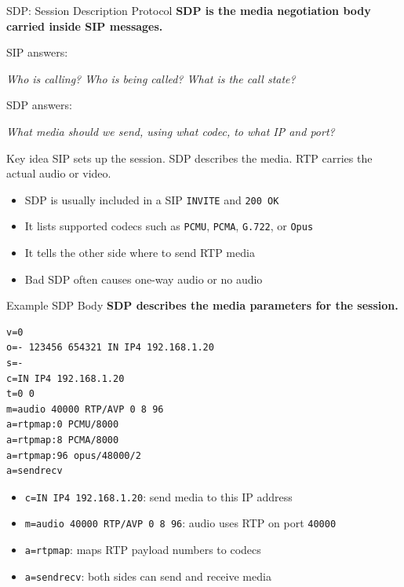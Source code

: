 \documentclass[aspectratio=169]{beamer}
\begin{document}
\begin{frame}{SDP: Session Description Protocol}
\textbf{SDP is the media negotiation body carried inside SIP messages.}

\vspace{0.4cm}

SIP answers:

\begin{center}
\textit{Who is calling? Who is being called? What is the call state?}
\end{center}

SDP answers:

\begin{center}
\textit{What media should we send, using what codec, to what IP and port?}
\end{center}

\vspace{0.3cm}

\begin{block}{Key idea}
SIP sets up the session. SDP describes the media. RTP carries the actual audio or video.
\end{block}

\vspace{0.3cm}

\begin{itemize}
    \item SDP is usually included in a SIP \texttt{INVITE} and \texttt{200 OK}
    \item It lists supported codecs such as \texttt{PCMU}, \texttt{PCMA}, \texttt{G.722}, or \texttt{Opus}
    \item It tells the other side where to send RTP media
    \item Bad SDP often causes one-way audio or no audio
\end{itemize}

\end{frame}

\begin{frame}[fragile]{Example SDP Body}
\textbf{SDP describes the media parameters for the session.}

\vspace{0.3cm}

\begin{lstlisting}
v=0
o=- 123456 654321 IN IP4 192.168.1.20
s=-
c=IN IP4 192.168.1.20
t=0 0
m=audio 40000 RTP/AVP 0 8 96
a=rtpmap:0 PCMU/8000
a=rtpmap:8 PCMA/8000
a=rtpmap:96 opus/48000/2
a=sendrecv
\end{lstlisting}

\begin{itemize}
    \item \texttt{c=IN IP4 192.168.1.20}: send media to this IP address
    \item \texttt{m=audio 40000 RTP/AVP 0 8 96}: audio uses RTP on port \texttt{40000}
    \item \texttt{a=rtpmap}: maps RTP payload numbers to codecs
    \item \texttt{a=sendrecv}: both sides can send and receive media
\end{itemize}

\end{frame}
\end{document}
